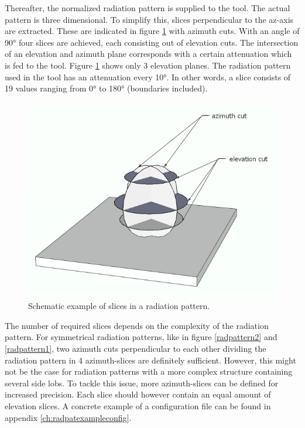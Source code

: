 Thereafter, the normalized radiation pattern is supplied to the tool. The actual pattern is three dimensional. To simplify this,
slices perpendicular to the az-axis are extracted. These are indicated in figure \ref{fig:slicesOfPattern} with azimuth cuts. With
an angle of \ang{90} four slices are achieved, each consisting out of elevation cuts. The intersection of an elevation and azimuth plane 
corresponds with a certain attenuation which is fed to the tool. Figure \ref{fig:slicesOfPattern} shows only 3 elevation planes. The radiation pattern used in the tool 
has an attenuation every \ang{10}. In other words, a slice consists of 19 values ranging from \ang{0} to \ang{180} (boundaries included).

\begin{figure}[H]
  \includegraphics[width=\textwidth]{../images/3Dimages/slicesOfPattern.jpg}
  \caption{Schematic example of slices in a radiation pattern.}
  \label{fig:slicesOfPattern}
\end{figure}

The number of required slices depends on the complexity of the radiation pattern. For symmetrical radiation patterns, like 
in figure \ref{radpattern2} and \ref{radpattern1}, two azimuth cuts perpendicular to each other dividing the radiation pattern in 4 azimuth-slices 
are definitely sufficient. However, this might not be the case for radiation patterns with a more complex structure containing several  
side lobs. To tackle this issue, more azimuth-slices can be defined for increased precision. Each slice should however contain an equal amount 
of elevation slices.  A concrete example of a configuration file can be found in appendix \ref{ch:radpatexampleconfig}.
 
